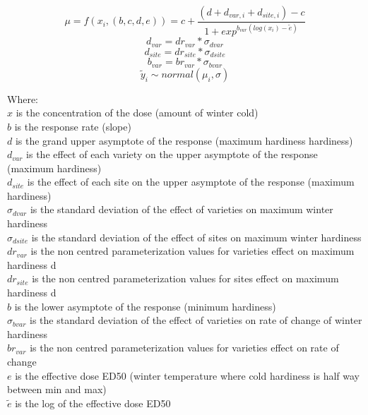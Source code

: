\documentclass[11pt,letter]{article}
\begin{document}
\begin{equation*}
\label{modelWithPriors}
\mu=f(x_{i},(b,c,d,e))=c+\frac{(d+d_{var,i} + d_{site,i}) -c}{1+exp^{b_{var}(log(x_{i})-\tilde{e})}}
\end{equation*}
\begin{equation*}
{d}_{var} = dr_{var} * \sigma_{dvar}
\end{equation*}
\begin{equation*}
{d}_{site} = dr_{site} * \sigma_{dsite}
\end{equation*}
\begin{equation*}
{b}_{var} = br_{var} * \sigma_{bvar}
\end{equation*}
\begin{equation*}
\tilde{y}_{i}\sim normal(\mu_{i},\sigma)
\end{equation*}

Where:\\
	$x$ is the concentration of the dose (amount of winter cold) \\
	$b$ is the response rate (slope)\\
	$d$ is the grand upper asymptote of the response (maximum hardiness hardiness) 
	$d_{var}$ is the effect of each variety on the upper asymptote of the response (maximum hardiness)\\
	$d_{site}$ is the effect of each site on the upper asymptote of the response (maximum hardiness)\\
	$\sigma_{dvar}$ is the standard deviation of the effect of varieties on maximum winter hardiness\\
	$\sigma_{dsite}$ is the standard deviation of the effect of sites on maximum winter hardiness\\
	$dr_{var}$ is the non centred parameterization values for varieties effect on maximum hardiness d\\
	$dr_{site}$ is the non centred parameterization values for sites effect on maximum hardiness d\\
	$b$ is the lower asymptote of the response (minimum hardiness)\\
	$\sigma_{bvar}$ is the standard deviation of the effect of varieties on rate of change of winter hardiness\\
	$br_{var}$ is the non centred parameterization values for varieties effect on rate of change\\
	$e$ is the effective dose ED50 (winter temperature where cold hardiness is half way between min and max)  \\
	$\tilde{e}$ is the log of the effective dose ED50\\
\end{document}
